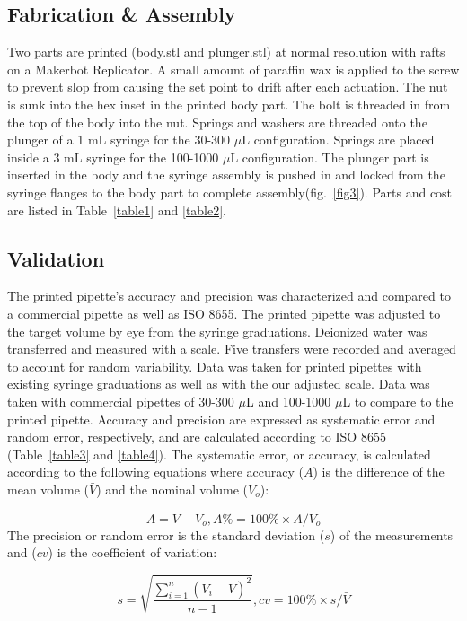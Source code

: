 \documentclass{nature}
\begin{document}
\begin{methods}
\subsection{Fabrication \& Assembly}
Two parts are printed (body.stl and plunger.stl) at normal resolution with rafts on a Makerbot Replicator.
A small amount of paraffin wax is applied to the screw to prevent slop from causing the set point to drift after each actuation.
The nut is sunk into the hex inset in the printed body part.
The bolt is threaded in from the top of the body into the nut.
Springs and washers are threaded onto the plunger of a 1 mL syringe for the 30-300 $\mu$L configuration.
Springs are placed inside a 3 mL syringe for the 100-1000 $\mu$L configuration.
The plunger part is inserted in the body and the syringe assembly is pushed in and locked from the syringe flanges to the body part to complete assembly(fig.~\ref{fig3}).
Parts and cost are listed in Table~\ref{table1} and \ref{table2}.

\subsection{Validation}
The printed pipette’s accuracy and precision was characterized and compared to a commercial pipette as well as ISO 8655.
The printed pipette was adjusted to the target volume by eye from the syringe graduations.
Deionized water was transferred and measured with a scale.
Five transfers were recorded and averaged to account for random variability.
Data was taken for printed pipettes with existing syringe graduations as well as with the our adjusted scale.
Data was taken with commercial pipettes of 30-300 $\mu$L and 100-1000 $\mu$L to compare to the printed pipette.
Accuracy and precision are expressed as systematic error and random error, respectively, and are calculated according to ISO 8655~\cite{ISO8655} (Table~\ref{table3} and \ref{table4}).
The systematic error, or accuracy, is calculated according to the following equations where accuracy ($A$) is the difference of the mean volume ($\bar{V}$) and the nominal volume ($V_{o}$):

\begin{equation}\label{eq:accuracy} 
A = \bar{V}-V_{o},
A\% = 100\%  \times  A / V_{o}
\end{equation}
The precision or random error is the standard deviation ($s$) of the measurements and ($cv$) is the coefficient of variation:

\begin{equation}\label{eq:precision} 
s = \sqrt{\frac{\sum_{i=1}^{n}(V_{i}-\bar{V})^2}{n-1}},
cv = 100\% \times s / \bar{V}
\end{equation}

\end{methods}
\end{document}
